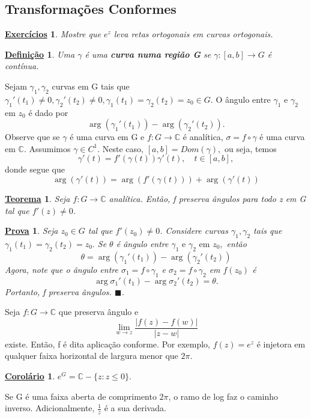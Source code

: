 \documentclass{article}
\newtheorem*{def*}{\underline{Defini\c c\~ao}}
\newtheorem*{theorem*}{\underline{Teorema}}
\newtheorem*{proof*}{\underline{Prova}}
\newtheorem*{crl*}{\underline{Corol\'ario}}
\newtheorem*{exer*}{\underline{Exerc\'icios}}
\renewcommand\qedsymbol{$\blacksquare$}
\begin{document}
  \subsection{Transforma\c c\~oes Conformes}
  \begin{exer*}
    Mostre que $e^{z}$ leva retas ortogonais em curvas ortogonais.
  \end{exer*}
  \begin{def*}
    Uma $\gamma$ \'e uma \textbf{curva numa regi\~ao G} se $\gamma:[a, b]\rightarrow G$ \'e cont\'inua.
  \end{def*}
  Sejam $\gamma _{1}, \gamma_2$ curvas em G tais que $\gamma_1'(t_1)\neq{0}, \gamma_2'(t_2)\neq{0}, \gamma_1(t_1) = \gamma_2(t_2) = z_{0}\in{G}.$
  O \^angulo entre $\gamma _{1}\text{ e }\gamma_2$ em $z_{0}$ \'e dado por
  $$
  \arg(\gamma_1'(t_1)) - \arg(\gamma_2'(t_2)).
  $$
  Observe que se $\gamma$ \'e uma curva em G e $f:G\rightarrow \mathbb{C}$ \'e anal\'itica,
  $\sigma = f\circ\gamma$ \'e uma curva em $\mathbb{C}.$ Assumimos $\gamma\in{C^1}.$ Neste
  caso, $[a, b] = Dom(\gamma),$ ou seja, temos
  $$
  \gamma'(t) = f'(\gamma(t))\gamma'(t), \quad t\in{[a, b]},
  $$
  donde segue que
  $$
  \arg(\gamma'(t)) = \arg(f'(\gamma(t))) + \arg(\gamma'(t))
  $$
  \begin{theorem*}
    Seja $f:G\rightarrow \mathbb{C}$ anal\'itica. Ent\~ao, f preserva \^angulos para todo
    z em G tal que $f'(z)\neq{0}$.
  \end{theorem*}
  \begin{proof*}
    Seja $z_{0}\in{G}$ tal que $f'(z_{0})\neq{0}$. Considere curvas $\gamma_1, \gamma_2$
    tais que $\gamma_1(t_1) = \gamma_2(t_2) = z_{0}.$ Se $\theta$ \'e \^angulo entre $\gamma_1\text{ e }\gamma_2\text{ em }z_{0},$
    ent\~ao
    $$
    \theta = \arg(\gamma_1'(t_1)) - \arg(\gamma_2'(t_2))
    $$
    Agora, note que o \^angulo entre $\sigma_1 = f\circ{\gamma_1}$ e $\sigma_2 = f\circ{\gamma_2}$ em
    $f(z_{0})$ \'e
    $$
    \arg \sigma_1'(t_1) - \arg \sigma_2'(t_2) = \theta.
    $$
    Portanto, f preserva \^angulos. \qedsymbol.
  \end{proof*}
  Seja $f:G\rightarrow \mathbb{C}$ que preserva \^angulo e 
  $$
  \lim_{w\to{z}} \frac{|f(z) - f(w)|}{|z-w|}
  $$
  existe. Ent\~ao, f \'e dita aplica\c c\~ao conforme. Por exemplo, $f(z) = e^z$ \'e injetora
  em qualquer faixa horizontal de largura menor que $2\pi.$
  \begin{crl*}
    $e ^{G} = \mathbb{C} - \{z: z\leq{0}\}.$
  \end{crl*}
  Se G \'e uma faixa aberta de comprimento $2\pi$, o ramo de log faz o caminho inverso. Adicionalmente,
  $\frac{1}{z}$ \'e a sua derivada.
  \newpage
\end{document}
